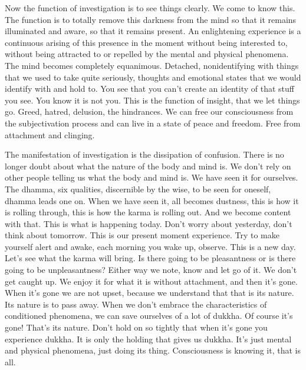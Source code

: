 \documentclass[letterpaper,10pt,english]{sphinxmanual}
\begin{document}
\sphinxAtStartPar
Now the function of investigation is to see things clearly. We come to
know this. The function is to totally remove this darkness from the mind so
that it remains illuminated and aware, so that it remains present. An enlightening  experience  is  a  continuous  arising  of  this  presence  in  the  moment
without  being  interested  to,  without  being  attracted  to  or  repelled  by  the
mental  and  physical  phenomena.  The  mind  becomes  completely  equanimous.   Detached, non\sphinxhyphen{}identifying with things that we used to take quite seriously, thoughts and emotional states that we would identify with and hold
to. You see that you can’t create an identity of that stuff you see. You know
it  is  not  you. This  is  the  function  of  insight,  that  we  let  things  go.  Greed,
hatred,  delusion,  the  hindrances.  We  can  free  our  consciousness  from  the
subjectivation  process  and  can  live  in  a  state  of  peace  and  freedom.  Free
from attachment and clinging.

\sphinxAtStartPar
The manifestation of investigation is the dissipation of confusion. There
is no longer doubt about what the nature of the body and mind is. We don’t
rely on other people telling us what the body and mind is. We have seen it for
ourselves. The dhamma, six qualities, discernible by the wise, to be seen for
oneself, dhamma leads one on. When we have seen it, all becomes dustness,
this is how it is rolling through, this is how the karma is rolling out. And
we become content with that. This is what is happening today. Don’t worry
about  yesterday,  don’t  think  about  tomorrow.  This  is  our  present  moment
experience. Try to make yourself alert and awake, each morning you wake
up, observe. This is a new day. Let’s see what the karma will bring. Is there
going to be pleasantness or is there going to be unpleasantness? Either way
we note, know and let go of it. We don’t get caught up. We enjoy it for what
it is without attachment, and then it’s gone. When it’s gone we are not upset,
because  we  understand  that  that  is  its  nature.  Its  nature  is  to  pass  away.
When we don’t embrace the characteristics of conditioned phenomena, we
can save ourselves of a lot of dukkha. Of course it’s gone! That’s its nature.
Don’t  hold  on  so  tightly  that  when  it’s  gone  you  experience  dukkha.  It  is
only the holding that gives us dukkha. It’s just mental and physical phenomena, just doing its thing. Consciousness is knowing it, that is all.
\end{document}
